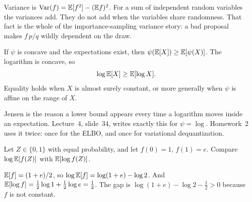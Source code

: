 Variance is $\mathrm{Var}(f)=\mathbb{E}[f^2]-(\mathbb{E} f)^2$. For a sum of independent random variables the variances add. They do not add when the variables share randomness. That fact is the whole of the importance-sampling variance story: a bad proposal makes $f\,p/q$ wildly dependent on the draw.

\begin{resultbox}[Jensen]
If $\psi$ is concave and the expectations exist, then $\psi(\mathbb{E}[X])\ge \mathbb{E}[\psi(X)]$. The logarithm is concave, so
\[
\log \mathbb{E}[X]\ge \mathbb{E}[\log X].
\]
Equality holds when $X$ is almost surely constant, or more generally when $\psi$ is affine on the range of $X$.
\end{resultbox}

\begin{intbox}
Jensen is the reason a lower bound appears every time a logarithm moves inside an expectation. Lecture~4, slide~34, writes exactly this for $\psi=\log$. Homework~2 uses it twice: once for the ELBO, and once for variational dequantization.
\end{intbox}

\begin{practbox}
Let $Z\in\{0,1\}$ with equal probability, and let $f(0)=1$, $f(1)=e$. Compare $\log\mathbb{E}[f(Z)]$ with $\mathbb{E}[\log f(Z)]$.
\end{practbox}
\begin{solbox}
$\mathbb{E}[f]=(1+e)/2$, so $\log\mathbb{E}[f]=\log(1+e)-\log 2$. And $\mathbb{E}[\log f]=\tfrac12\log 1+\tfrac12\log e=\tfrac12$. The gap is $\log(1+e)-\log 2-\tfrac12>0$ because $f$ is not constant.
\end{solbox}
